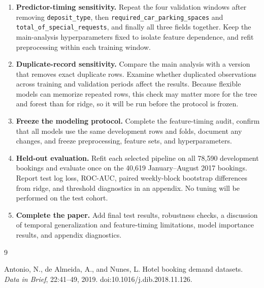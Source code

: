 \documentclass{article}
\begin{document}
\begin{enumerate}
    \item \textbf{Predictor-timing sensitivity.}
    Repeat the four validation windows after removing
    \texttt{deposit\_type}, then
    \texttt{required\_car\_parking\_spaces} and
    \texttt{total\_of\_special\_requests}, and finally all three
    fields together. Keep the main-analysis hyperparameters fixed
    to isolate feature dependence, and refit preprocessing within
    each training window.

    \item \textbf{Duplicate-record sensitivity.}
    Compare the main analysis with a version that removes exact
    duplicate rows. Examine whether duplicated observations across
    training and validation periods affect the results. Because
    flexible models can memorize repeated rows, this check may matter
    more for the tree and forest than for ridge, so it will be run
    before the protocol is frozen.

    \item \textbf{Freeze the modeling protocol.}
    Complete the feature-timing audit, confirm that all models use
    the same development rows and folds, document any changes,
    and freeze preprocessing, feature sets, and hyperparameters.

    \item \textbf{Held-out evaluation.}
    Refit each selected pipeline on all 78,590 development bookings
    and evaluate once on the 40,619 January--August 2017 bookings.
    Report test log loss, ROC-AUC, paired weekly-block bootstrap
    differences from ridge, and threshold diagnostics in an
    appendix. No tuning will be performed on the test cohort.

    \item \textbf{Complete the paper.}
    Add final test results, robustness checks, a discussion of
    temporal generalization and feature-timing limitations, model
    importance results, and appendix diagnostics.
\end{enumerate}

\begin{thebibliography}{9}

Antonio, N., de Almeida, A., and Nunes, L.
\newblock Hotel booking demand datasets.
\newblock \textit{Data in Brief}, 22:41--49, 2019.
\newblock doi:10.1016/j.dib.2018.11.126.

\end{thebibliography}
\end{document}
